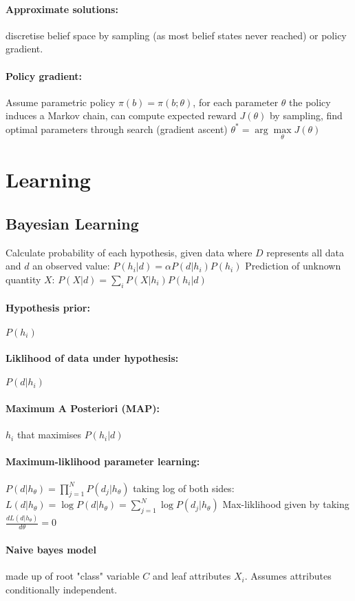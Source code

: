 \begin{multicols}{4}
\paragraph{Approximate solutions:} discretise belief space by sampling (as most belief states never reached) or policy gradient.
\paragraph{Policy gradient:} Assume parametric policy $\pi(b) = \pi(b;\theta)$, for each parameter $\theta$ the policy induces a Markov chain, can compute expected reward $J(\theta)$ by sampling, find optimal parameters through search (gradient ascent) $\theta^* = \arg\max\limits_{\theta} J(\theta)$

\section{Learning}
\subsection{Bayesian Learning}
Calculate probability of each hypothesis, given data where $D$ represents all data and $d$ an observed value: $P(h_i|d) = \alpha P(d|h_i)P(h_i)$
Prediction of unknown quantity $X$: $P(X|d) = \sum\limits_i P(X|h_i)P(h_i|d)$
\paragraph{Hypothesis prior:} $P(h_i)$
\paragraph{Liklihood of data under hypothesis:} $P(d|h_i)$
\paragraph{Maximum A Posteriori (MAP):} $h_i$ that maximises $P(h_i|d)$

\paragraph{Maximum-liklihood parameter learning:} $P(d|h_{\theta}) = \prod\limits_{j=1}^{N}P(d_j|h_{\theta})$ taking log of both sides: $L(d|h_{\theta}) = \log P(d|h_{\theta}) = \sum\limits_{j=1}^{N} \log P(d_j|h_{\theta})$ Max-liklihood given by taking $\frac{dL(d|h_{\theta})}{d\theta} = 0$

\paragraph{Naive bayes model} made up of root "class" variable $C$ and leaf attributes $X_i$. Assumes attributes conditionally independent.


\end{multicols}
